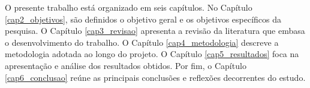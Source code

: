 O presente trabalho está organizado em seis capítulos. No Capítulo \ref{cap2_objetivos}, são definidos o objetivo geral e os objetivos específicos da pesquisa. O Capítulo \ref{cap3_revisao} apresenta a revisão da literatura que embasa o desenvolvimento do trabalho. O Capítulo \ref{cap4_metodologia} descreve a metodologia adotada ao longo do projeto. O Capítulo \ref{cap5_resultados} foca na apresentação e análise dos resultados obtidos. Por fim, o Capítulo \ref{cap6_conclusao} reúne as principais conclusões e reflexões decorrentes do estudo.